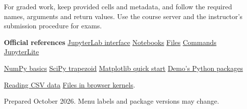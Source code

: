 \documentclass[11pt,a4paper]{article}
\begin{document}
For graded work, keep provided cells and metadata, and follow the required
names, arguments and return values. Use the course server and the
instructor's submission procedure for exams.

\vfill
{\footnotesize\color{muted}
\textbf{Official references}\quad
\href{https://jupyterlab.readthedocs.io/en/stable/user/interface.html}{JupyterLab interface}
\;\textbullet\;
\href{https://jupyterlab.readthedocs.io/en/stable/user/notebook.html}{Notebooks}
\;\textbullet\;
\href{https://jupyterlab.readthedocs.io/en/stable/user/files.html}{Files}
\;\textbullet\;
\href{https://jupyterlab.readthedocs.io/en/stable/user/commands.html}{Commands}
\;\textbullet\;
\href{https://jupyterlite.readthedocs.io/en/stable/quickstart/using.html}{JupyterLite}\par
\href{https://numpy.org/doc/stable/user/absolute_beginners.html}{NumPy basics}
\;\textbullet\;
\href{https://docs.scipy.org/doc/scipy/reference/generated/scipy.integrate.trapezoid.html}{SciPy trapezoid}
\;\textbullet\;
\href{https://matplotlib.org/stable/users/explain/quick_start.html}{Matplotlib quick start}
\;\textbullet\;
\href{https://github.com/jupyter/try-jupyter/blob/main/environment-python.yml}{Demo's Python packages}\par
\href{https://numpy.org/doc/stable/reference/generated/numpy.loadtxt.html}{Reading CSV data}
\;\textbullet\;
\href{https://jupyterlite.readthedocs.io/en/stable/howto/content/python.html}{Files in browser kernels}.\par
Prepared October 2026. Menu labels and package versions may change.}
\end{document}

